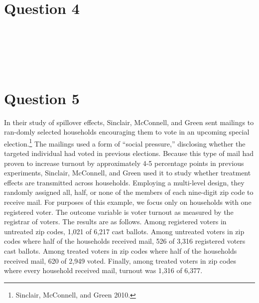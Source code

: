 \documentclass[11pt,notitlepage]{article}\usepackage[]{graphicx}\usepackage[]{color}
\makeatletter
\newenvironment{kframe}{%
 \def\at@end@of@kframe{}%
 \ifinner\ifhmode%
  \def\at@end@of@kframe{\end{minipage}}%
  \begin{minipage}{\columnwidth}%
 \fi\fi%
 \def\FrameCommand##1{\hskip\@totalleftmargin \hskip-\fboxsep
 \colorbox{shadecolor}{##1}\hskip-\fboxsep
     \hskip-\linewidth \hskip-\@totalleftmargin \hskip\columnwidth}%
 \MakeFramed {\advance\hsize-\width
   \@totalleftmargin\z@ \linewidth\hsize
   \@setminipage}}%
 {\par\unskip\endMakeFramed%
 \at@end@of@kframe}
\newenvironment{knitrout}{}{} %
\makeatother
\begin{document}
\section*{Question 4}
\begin{knitrout}
\color{fgcolor}\begin{kframe}
\begin{verbatim}






\end{verbatim}
\end{kframe}
\end{knitrout}


\section*{Question 5}
In their study of spillover effects, Sinclair, McConnell, and Green sent mailings to ran-domly selected households encouraging them to vote in an upcoming special election.\footnote{Sinclair, McConnell, and Green 2010.} The mailings used a form of ``social pressure,'' disclosing whether the targeted individual had voted in previous elections. Because this type of mail had proven to increase turnout by approximately 4-5 percentage points in previous experiments, Sinclair, McConnell, and Green used it to study whether treatment effects are transmitted across households. Employing a multi-level design, they randomly assigned all, half, or none of the members of each nine-digit zip code to receive mail. For purposes of this example, we focus only on households with one registered voter. The outcome variable is voter turnout as measured by the registrar of voters. The results are as follows. Among registered voters in untreated zip codes, 1,021 of 6,217 cast ballots. Among untreated voters in zip codes where half of the households received mail, 526 of 3,316 registered voters cast ballots. Among treated voters in zip codes where half of the households received mail, 620 of 2,949 voted. Finally, among treated voters in zip codes where every household received mail, turnout was 1,316 of 6,377.
\end{document}
